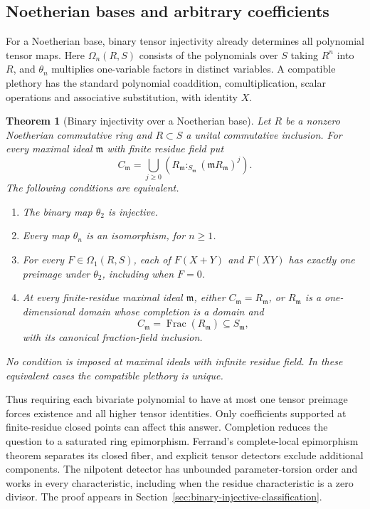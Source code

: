 \documentclass[11pt,a4paper]{article}
\newtheorem{theorem}{Theorem}[section]
\theoremstyle{definition}
\begin{document}
\subsection{Noetherian bases and arbitrary coefficients}
For a Noetherian base, binary tensor injectivity already determines
all polynomial tensor maps. Here $\Omega_n(R,S)$ consists of the
polynomials over $S$ taking $R^n$ into $R$, and $\theta_n$ multiplies
one-variable factors in distinct variables. A compatible plethory
has the standard polynomial coaddition, comultiplication, scalar
operations and associative substitution, with identity $X$.
\begin{theorem}[Binary injectivity over a Noetherian base]
\label{thm:arbitrary-noetherian-coefficients}
Let $R$ be a nonzero Noetherian commutative ring and $R\subset S$ a
unital commutative inclusion. For every maximal ideal $\mathfrak m$
with finite residue field put
\[
 C_{\mathfrak m}=\bigcup_{j\ge0}
 (R_{\mathfrak m}:_{S_{\mathfrak m}}(\mathfrak mR_{\mathfrak m})^j).
\]
The following conditions are equivalent.
\begin{enumerate}[label=\textup{(\roman*)}]
\item The binary map $\theta_2$ is injective.
\item Every map $\theta_n$ is an isomorphism, for $n\ge1$.
\item For every $F\in\Omega_1(R,S)$, each of $F(X+Y)$ and $F(XY)$
      has exactly one preimage under $\theta_2$, including when $F=0$.
\item At every finite-residue maximal ideal $\mathfrak m$, either
      $C_{\mathfrak m}=R_{\mathfrak m}$, or
      $R_{\mathfrak m}$ is a one-dimensional domain whose completion
      is a domain and
      \[
       C_{\mathfrak m}=\operatorname{Frac}(R_{\mathfrak m})
                        \subseteq S_{\mathfrak m},
      \]
      with its canonical fraction-field inclusion.
\end{enumerate}
No condition is imposed at maximal ideals with infinite residue
field. In these equivalent cases the compatible plethory is unique.
\end{theorem}
Thus requiring each bivariate polynomial to have at most one tensor
preimage forces existence and all higher tensor identities. Only coefficients
supported at finite-residue closed points can affect this answer.
Completion reduces the question to a saturated ring epimorphism.
Ferrand's complete-local epimorphism theorem separates its closed
fiber, and explicit tensor detectors exclude additional components.
The nilpotent detector has unbounded parameter-torsion order and
works in every characteristic, including when the residue
characteristic is a zero divisor. The proof appears in
Section~\ref{sec:binary-injective-classification}.
\end{document}
